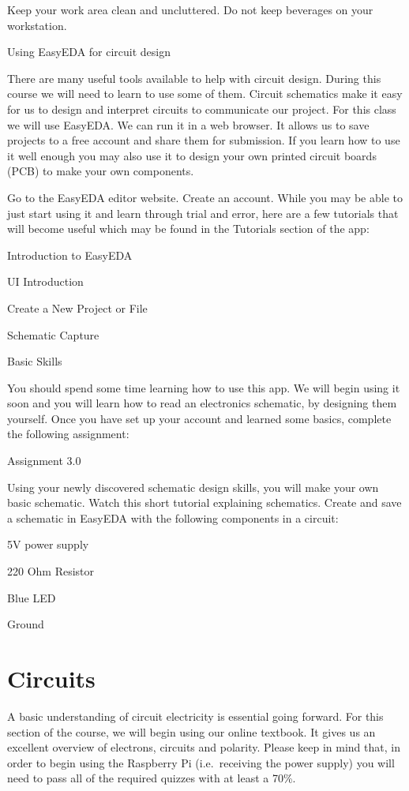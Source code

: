 \documentclass[
]{book}
\begin{document}
Keep your work area clean and uncluttered. Do not keep beverages on your workstation.

Using EasyEDA for circuit design

There are many useful tools available to help with circuit design. During this course we will need to learn to use some of them. Circuit schematics make it easy for us to design and interpret circuits to communicate our project. For this class we will use EasyEDA. We can run it in a web browser. It allows us to save projects to a free account and share them for submission. If you learn how to use it well enough you may also use it to design your own printed circuit boards (PCB) to make your own components.

Go to the EasyEDA editor website. Create an account. While you may be able to just start using it and learn through trial and error, here are a few tutorials that will become useful which may be found in the Tutorials section of the app:

Introduction to EasyEDA

UI Introduction

Create a New Project or File

Schematic Capture

Basic Skills

You should spend some time learning how to use this app. We will begin using it soon and you will learn how to read an electronics schematic, by designing them yourself. Once you have set up your account and learned some basics, complete the following assignment:

Assignment 3.0

Using your newly discovered schematic design skills, you will make your own basic schematic. Watch this short tutorial explaining schematics. Create and save a schematic in EasyEDA with the following components in a circuit:

5V power supply

220 Ohm Resistor

Blue LED

Ground

\hypertarget{circuits}{%
\section{Circuits}\label{circuits}}

A basic understanding of circuit electricity is essential going forward. For this section of the course, we will begin using our online textbook. It gives us an excellent overview of electrons, circuits and polarity. Please keep in mind that, in order to begin using the Raspberry Pi (i.e.~receiving the power supply) you will need to pass all of the required quizzes with at least a 70\%.
\end{document}
